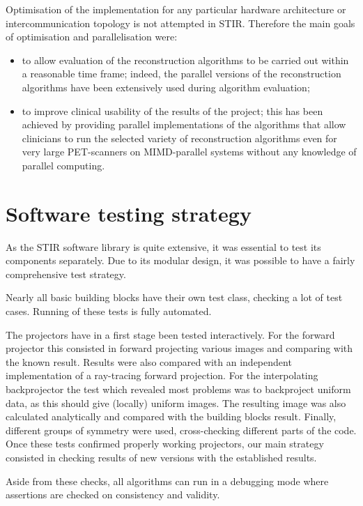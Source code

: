 \documentclass{article}
\begin{document}
Optimisation of the implementation for any particular hardware 
architecture or intercommunication topology is not attempted 
in STIR. Therefore the main goals of optimisation and parallelisation 
were:
\begin{itemize}
\item to allow evaluation of the reconstruction algorithms to be 
carried out within a reasonable time frame; indeed, the parallel 
versions of the reconstruction algorithms have been extensively 
used during algorithm evaluation;
\item to improve clinical usability of the results of the project; 
this has been achieved by providing parallel implementations 
of the algorithms that allow clinicians to run the selected variety 
of reconstruction algorithms even for very large PET-scanners 
on MIMD-parallel systems without any knowledge of parallel computing.
\end{itemize}


\section{
Software testing strategy}

As the STIR software library is quite extensive, it was essential 
to test its components separately. Due to its modular design, 
it was possible to have a fairly comprehensive test strategy.

Nearly all basic building blocks have their own test class, checking 
a lot of test cases. Running of these tests is fully automated.

The projectors have in a first stage been tested interactively. 
For the forward projector this consisted in forward projecting 
various images and comparing with the known result. Results were 
also compared with an independent implementation of a ray-tracing 
forward projection. For the interpolating backprojector the test 
which revealed most problems was to backproject uniform data, 
as this should give (locally) uniform images. The resulting image 
was also calculated analytically and compared with the building 
blocks result. Finally, different groups of symmetry were used, 
cross-checking different parts of the code. Once these tests 
confirmed properly working projectors, our main strategy consisted 
in checking results of new versions with the established results.

Aside from these checks, all algorithms can run in a debugging 
mode where assertions are checked on consistency and validity.
\end{document}
